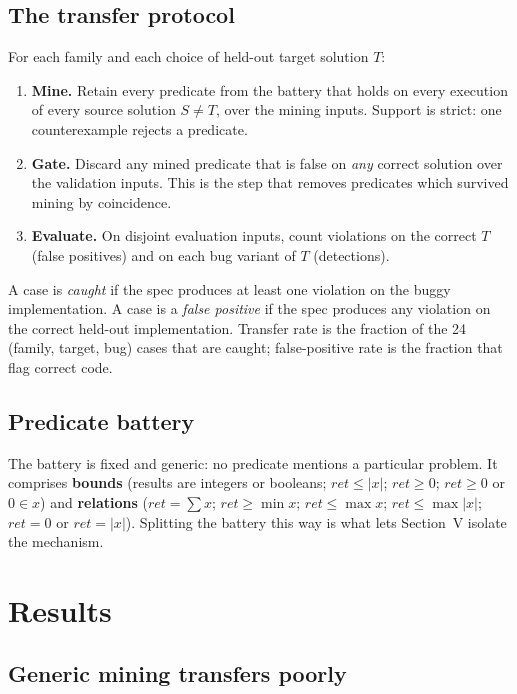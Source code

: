 \documentclass[conference]{IEEEtran}
\begin{document}
\subsection{The transfer protocol}

For each family and each choice of held-out target solution $T$:

\begin{enumerate}
\item \textbf{Mine.} Retain every predicate from the battery that holds on every execution
of every source solution $S \neq T$, over the mining inputs. Support is strict: one
counterexample rejects a predicate.
\item \textbf{Gate.} Discard any mined predicate that is false on \emph{any} correct
solution over the validation inputs. This is the step that removes predicates which
survived mining by coincidence.
\item \textbf{Evaluate.} On disjoint evaluation inputs, count violations on the correct $T$
(false positives) and on each bug variant of $T$ (detections).
\end{enumerate}

A case is \emph{caught} if the spec produces at least one violation on the buggy
implementation. A case is a \emph{false positive} if the spec produces any violation on the
correct held-out implementation. Transfer rate is the fraction of the 24 (family, target,
bug) cases that are caught; false-positive rate is the fraction that flag correct code.

\subsection{Predicate battery}

The battery is fixed and generic: no predicate mentions a particular problem. It comprises
\textbf{bounds} (results are integers or booleans; $\mathit{ret} \le |x|$;
$\mathit{ret} \ge 0$; $\mathit{ret} \ge 0$ or $0 \in x$) and \textbf{relations}
($\mathit{ret} = \sum x$; $\mathit{ret} \ge \min x$; $\mathit{ret} \le \max x$;
$\mathit{ret} \le \max|x|$; $\mathit{ret} = 0$ or $\mathit{ret} = |x|$). Splitting the
battery this way is what lets Section~V isolate the mechanism.

\section{Results}

\subsection{Generic mining transfers poorly}
\end{document}
